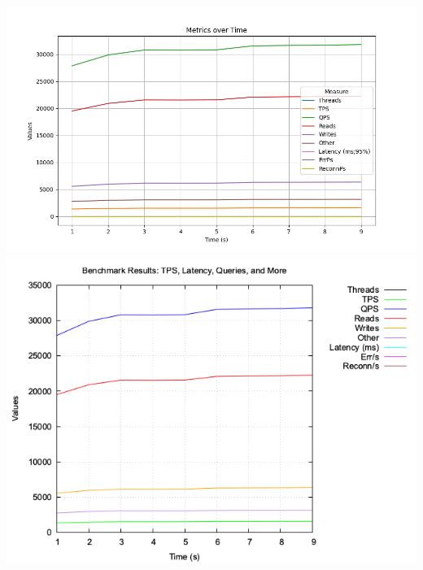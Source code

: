 \includegraphics[width=.8\textwidth]{PNGs/Demo/Summary.png}
\includegraphics[width=.8\textwidth]{PNGs/Demo/sysbench_output.png}


